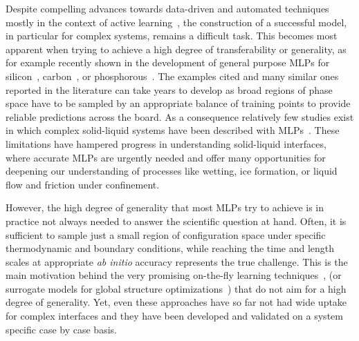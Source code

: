 \documentclass[aip,jcp,amsmath,amssymb,floatfix,reprint,citeautoscript,noeprint]{revtex4-1}
\begin{document}
\begin{bibunit}
%
Despite compelling advances towards data-driven and automated techniques
mostly in the context of active learning~\cite{%
Gastegger2017/10.1039/c7sc02267k,%
Podryabinkin2017/10.1016/j.commatsci.2017.08.031,%
Zhang2019/10.1103/PhysRevMaterials.3.023804,%
Smith2018/10.1063/1.5023802,%
Deringer2018/10.1103/PhysRevLett.120.156001,%
Schutt2018/10.1063/1.5019779,%
Musil2018/10.1039/c7sc04665k,%
Schran2020/10.1021/acs.jctc.9b00805%
},
the construction of a successful model, in particular for complex systems,
remains a difficult task.
%
This becomes most apparent
when trying to achieve a high degree of
transferability or generality,
as for example recently shown in the development
of general purpose MLPs
for silicon~\cite{Bartok2018/10.1103/PhysRevX.8.041048},
carbon~\cite{Rowe2020/10.1063/5.0005084},
or phosphorous~\cite{Deringer2020/10.1038/s41467-020-19168-z}.
%
The examples cited and many similar ones reported in the literature can take years to develop as broad regions of phase space
have to be sampled by an appropriate balance of training points
to provide reliable predictions across the board.
%
As a consequence relatively few studies exist in which complex solid-liquid systems have been described with MLPs~\cite{%
Natarajan2016/10.1039/c6cp05711j,%
Hellstrom2019/10.1039/c8sc03033b,%
Andrade2020/10.1039/c9sc05116c,%
Ghorbanfekr2020/10.1021/acs.jpclett.0c01739,%
Artrith2019/10.1088/2515-7655/ab2060%
}.
%
These limitations have hampered progress in understanding solid-liquid interfaces,
where accurate MLPs are urgently needed and offer many opportunities
for deepening our understanding of processes like wetting, ice formation,
or liquid flow and friction under confinement.

%
However, the high degree of generality that most MLPs try to achieve is in practice not always needed to answer the scientific question at hand.
%
Often, it is sufficient to sample just a small region of configuration space under specific thermodynamic and boundary conditions, while reaching the time and length scales at appropriate
\textit{ab initio} accuracy represents the true challenge.
%
This is the main motivation behind the very promising on-the-fly learning techniques~\cite{%
Li2015/10.1103/PhysRevLett.114.096405,
Jinnouchi2020/10.1021/acs.jpclett.0c01061,
Vandermause2020/10.1038/s41524-020-0283-z},
(or surrogate models for global structure
optimizations~\cite{Bisbo2020/10.1103/PhysRevLett.124.086102})
that do not aim for a high degree of generality.
%
Yet, even these approaches have so far not had wide uptake for complex interfaces and they have been developed and validated on a system specific case by case basis. 
%


\end{bibunit}
\end{document}
